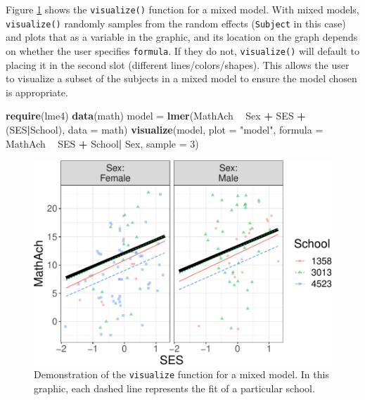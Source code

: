 \documentclass[
  man]{apa6}
\newenvironment{Shaded}{\begin{snugshade}}{\end{snugshade}}
\newcommand{\DataTypeTok}[1]{\textcolor[rgb]{0.13,0.29,0.53}{#1}}
\newcommand{\DecValTok}[1]{\textcolor[rgb]{0.00,0.00,0.81}{#1}}
\newcommand{\KeywordTok}[1]{\textcolor[rgb]{0.13,0.29,0.53}{\textbf{#1}}}
\newcommand{\NormalTok}[1]{#1}
\newcommand{\OperatorTok}[1]{\textcolor[rgb]{0.81,0.36,0.00}{\textbf{#1}}}
\newcommand{\StringTok}[1]{\textcolor[rgb]{0.31,0.60,0.02}{#1}}
\begin{document}
Figure \ref{fig:mixed} shows the \texttt{visualize()} function for a mixed model. With mixed models, \texttt{visualize()} randomly samples from the random effects (\texttt{Subject} in this case) and plots that as a variable in the graphic, and its location on the graph depends on whether the user specifies \texttt{formula}. If they do not, \texttt{visualize()} will default to placing it in the second slot (different lines/colors/shapes). This allows the user to visualize a subset of the subjects in a mixed model to ensure the model chosen is appropriate.

\begin{Shaded}
\begin{Highlighting}[]
\KeywordTok{require}\NormalTok{(lme4)}
\KeywordTok{data}\NormalTok{(math)}
\NormalTok{model =}\StringTok{ }\KeywordTok{lmer}\NormalTok{(MathAch }\OperatorTok{~}\StringTok{ }\NormalTok{Sex }\OperatorTok{+}\StringTok{ }\NormalTok{SES }\OperatorTok{+}\StringTok{ }\NormalTok{(SES}\OperatorTok{|}\NormalTok{School), }\DataTypeTok{data =}\NormalTok{ math)}
\KeywordTok{visualize}\NormalTok{(model, }
  \DataTypeTok{plot =} \StringTok{"model"}\NormalTok{,}
  \DataTypeTok{formula =}\NormalTok{ MathAch }\OperatorTok{~}\StringTok{  }\NormalTok{SES }\OperatorTok{+}\StringTok{ }\NormalTok{School}\OperatorTok{|}\StringTok{ }\NormalTok{Sex, }
  \DataTypeTok{sample =} \DecValTok{3}\NormalTok{)}
\end{Highlighting}
\end{Shaded}

\begin{figure}
\centering
\includegraphics{flexplot_psychmeth_files/figure-latex/mixed-1.pdf}
\caption{\label{fig:mixed}Demonstration of the \texttt{visualize} function for a mixed model. In this graphic, each dashed line represents the fit of a particular school. \label{fig:mixed}}
\end{figure}
\end{document}
